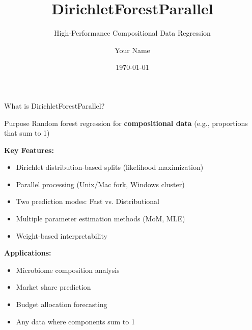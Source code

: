 \documentclass[aspectratio=169]{beamer}
\title{DirichletForestParallel}
\subtitle{High-Performance Compositional Data Regression}
\author{Your Name}
\date{\today}
\begin{document}
\begin{frame}
\titlepage
\end{frame}

\begin{frame}{What is DirichletForestParallel?}

\begin{block}{Purpose}
Random forest regression for \textbf{compositional data} (e.g., proportions that sum to 1)
\end{block}

\vspace{0.3cm}

\textbf{Key Features:}
\begin{itemize}
\item Dirichlet distribution-based splits (likelihood maximization)
\item Parallel processing (Unix/Mac fork, Windows cluster)
\item Two prediction modes: Fast vs. Distributional
\item Multiple parameter estimation methods (MoM, MLE)
\item Weight-based interpretability
\end{itemize}

\vspace{0.3cm}

\textbf{Applications:}
\begin{itemize}
\item Microbiome composition analysis
\item Market share prediction
\item Budget allocation forecasting
\item Any data where components sum to 1
\end{itemize}

\end{frame}
\end{document}
